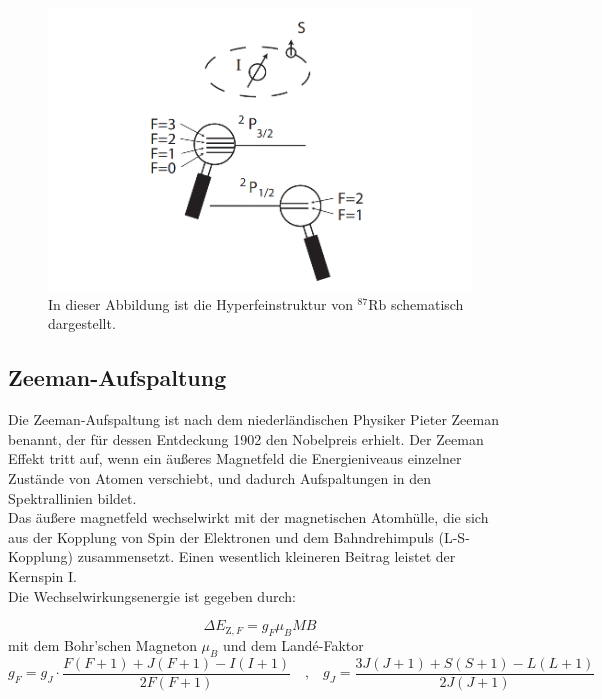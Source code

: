 \begin{figure}[H]
    \centering
    \includegraphics[scale=0.4]{figures/hyperfeinstruktur.png}
    \caption{In dieser Abbildung ist die Hyperfeinstruktur von $^{87}\text{Rb}$ schematisch dargestellt.\cite{pdf_anleitung}}
    \label{fig:hyper}
\end{figure}

\subsection{Zeeman-Aufspaltung}
Die Zeeman-Aufspaltung ist nach dem niederländischen Physiker Pieter Zeeman benannt, der für dessen Entdeckung 1902 den Nobelpreis erhielt.
Der Zeeman Effekt tritt auf, wenn ein äußeres Magnetfeld die Energieniveaus einzelner Zustände von Atomen verschiebt, und dadurch Aufspaltungen in den Spektrallinien bildet.\\
Das äußere magnetfeld wechselwirkt mit der magnetischen Atomhülle, die sich aus der Kopplung von Spin der Elektronen und dem Bahndrehimpuls (L-S-Kopplung) zusammensetzt.
Einen wesentlich kleineren Beitrag leistet der Kernspin I.\\
Die Wechselwirkungsenergie ist gegeben durch:

\begin{equation}
    \Delta E_{\text{Z},F} = g_F \mu_B M B
    \label{eq:zeeman}
\end{equation}
mit dem Bohr'schen Magneton $\mu_B$ und dem Landé-Faktor
\begin{equation}
    g_F = g_J \cdot \frac{F(F+1) + J(F+1) - I(I+1)}{2F(F+1)}
    \quad \text{,} \quad
    g_J = \frac{3J(J+1) + S(S+1) - L(L+1)}{2J(J+1)}
\end{equation}

